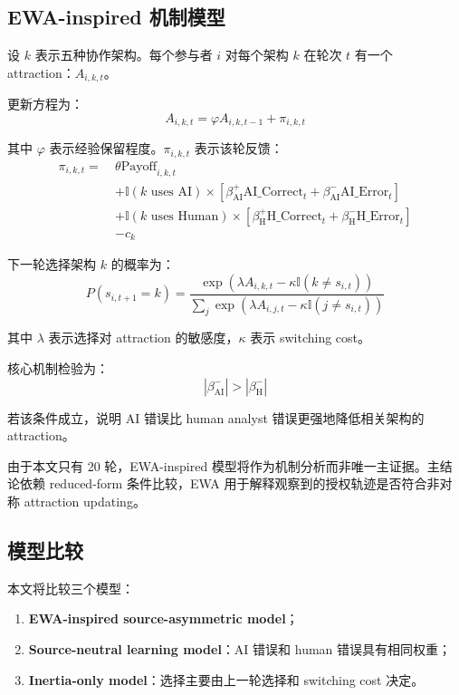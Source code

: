 \documentclass[12pt]{article}
\begin{document}
\subsection{EWA-inspired 机制模型}

设 $k$ 表示五种协作架构。每个参与者 $i$ 对每个架构 $k$ 在轮次 $t$ 有一个 attraction：$A_{i,k,t}$。

更新方程为：
\[
A_{i,k,t} = \varphi A_{i,k,t-1} + \pi_{i,k,t}
\]

其中 $\varphi$ 表示经验保留程度。$\pi_{i,k,t}$ 表示该轮反馈：
\begin{align*}
\pi_{i,k,t} =\ & \theta \text{Payoff}_{i,k,t} \\
& + \mathbb{I}(k \text{ uses AI}) \times [\beta_{\text{AI}}^{+} \text{AI\_Correct}_t + \beta_{\text{AI}}^{-} \text{AI\_Error}_t] \\
& + \mathbb{I}(k \text{ uses Human}) \times [\beta_{\text{H}}^{+} \text{H\_Correct}_t + \beta_{\text{H}}^{-} \text{H\_Error}_t] \\
& - c_k
\end{align*}

下一轮选择架构 $k$ 的概率为：
\[
P(s_{i,t+1} = k) = \frac{\exp(\lambda A_{i,k,t} - \kappa \mathbb{I}(k \neq s_{i,t}))}{\sum_j \exp(\lambda A_{i,j,t} - \kappa \mathbb{I}(j \neq s_{i,t}))}
\]

其中 $\lambda$ 表示选择对 attraction 的敏感度，$\kappa$ 表示 switching cost。

核心机制检验为：
\[
|\beta_{\text{AI}}^{-}| > |\beta_{\text{H}}^{-}|
\]

若该条件成立，说明 AI 错误比 human analyst 错误更强地降低相关架构的 attraction。

由于本文只有 20 轮，EWA-inspired 模型将作为机制分析而非唯一主证据。主结论依赖 reduced-form 条件比较，EWA 用于解释观察到的授权轨迹是否符合非对称 attraction updating。

\subsection{模型比较}

本文将比较三个模型：
\begin{enumerate}[label=\arabic*.]
    \item \textbf{EWA-inspired source-asymmetric model}；
    \item \textbf{Source-neutral learning model}：AI 错误和 human 错误具有相同权重；
    \item \textbf{Inertia-only model}：选择主要由上一轮选择和 switching cost 决定。
\end{enumerate}
\end{document}
